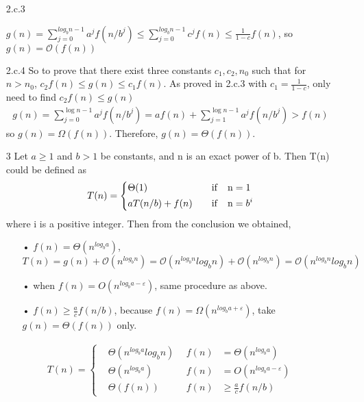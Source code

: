\documentclass{assignment}
\begin{document}
\begin{homeworkProblem}
\begin{enumerate}
\item[2.c.3]

$g(n) = \sum_{j = 0}^{log_bn - 1} a^jf(n / b^j) \leq  \sum_{j = 0}^{log_bn - 1} c^jf(n)\leq \frac{1}{1-c} f(n)$, so $g(n) = \mathcal{O}(f(n))$

\item[2.c.4]
So to prove that there exist three constants $c_1, c_2, n_0$ such that for $n>n_0$, $c_2 f(n)\leq g(n) \leq c_1 f(n) $. As proved in 2.c.3 with $c_1 = \frac{1}{1-c}$, only need to find $c_2 f(n)\leq g(n)$
\begin{align*}
  g(n)=\sum_{j=0}^{\log n-1} a^{j} f\left(n / b^{j}\right) 
  = a f\left(n\right)+\sum_{j=1}^{\log n-1} a^{j} f\left(n / b^{j}\right) 
  > f(n)
\end{align*}
so $g(n) = \Omega(f(n))$. Therefore, $g(n) = \Theta(f(n))$.
\item[3] Let $a\geq 1$ and $b > 1$ be constants, and n is an exact power of b. Then T(n) could be defined as 
\begin{align*}
	T(n) = \left\{
	\begin{aligned}
	&\Theta(1) \ \ \ & \rm{if } \quad n &= 1 \\
	& a T(n / b)+f(n)\ \ \  & \rm{if } \quad n &= b^i
	\end{aligned}
	\right.
\end{align*}
where i is a positive integer. Then from the conclusion we obtained, 
\begin{enumerate}
\item[•] $f(n) = \Theta(n^{log_ba})$, $T(n) = g(n) + \mathcal{O}(n^{log_bn}) = \mathcal{O}(n^{log_bn} log_bn)+\mathcal{O}(n^{log_bn}) = \mathcal{O}(n^{log_bn}log_bn)$
\item[•] when $f(n) = O(n^{log_ba- \varepsilon})$, same procedure as above.
\item[•] $f(n) \geq  \frac{a}{c}f(n/b)$, because $f(n) = \Omega(n^{log_ba+ \varepsilon})$, take $g(n) = \Theta(f(n))$ only.
\end{enumerate}
\begin{align*}
	T(n) = \left\{
	\begin{aligned}
	&\Theta(n^{log_ba} log_bn) \ \ & f(n) &= \Theta(n^{log_ba})\\
	& \Theta(n^{log_ba})\ \ \  & f(n) &= O(n^{log_ba- \varepsilon}) \\
	& \Theta(f(n))\ \  & f(n) &\geq  \frac{a}{c}f(n/b)
	\end{aligned}
	\right.
\end{align*}

    \end{enumerate}
    \end{homeworkProblem}
    
\end{document}
